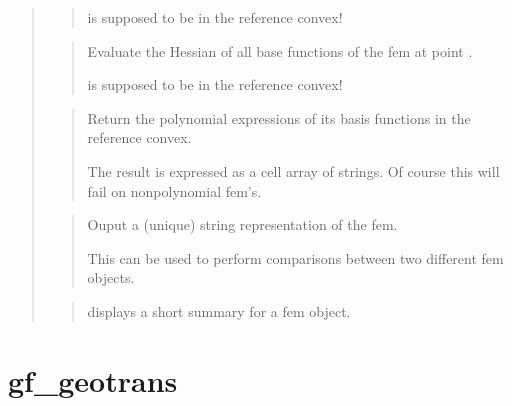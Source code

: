 \documentclass[a4paper,11pt,english]{sphinxmanual}
\begin{document}
\begin{quote}
\begin{quote}
\sphinxAtStartPar
{} is supposed to be in the reference convex!
\end{quote}

\sphinxAtStartPar
{}
\begin{quote}

\sphinxAtStartPar
Evaluate the Hessian of all base functions of the fem at point .

\sphinxAtStartPar
{} is supposed to be in the reference convex!
\end{quote}

\sphinxAtStartPar
{}
\begin{quote}

\sphinxAtStartPar
Return the polynomial expressions of its basis functions in
the reference convex.

\sphinxAtStartPar
The result is expressed as a cell array of
strings. Of course this will fail on non\sphinxhyphen{}polynomial fem’s.
\end{quote}

\sphinxAtStartPar
{}
\begin{quote}

\sphinxAtStartPar
Ouput a (unique) string representation of the fem.

\sphinxAtStartPar
This can be used to perform comparisons between two different fem
objects.
\end{quote}

\sphinxAtStartPar
{}
\begin{quote}

\sphinxAtStartPar
displays a short summary for a fem object.
\end{quote}
\end{quote}


\section{gf\_geotrans}
\label{\detokenize{matlab_octave/cmdref_gf_geotrans:gf-geotrans}}\label{\detokenize{matlab_octave/cmdref_gf_geotrans::doc}}
\sphinxAtStartPar
{}
\end{document}
